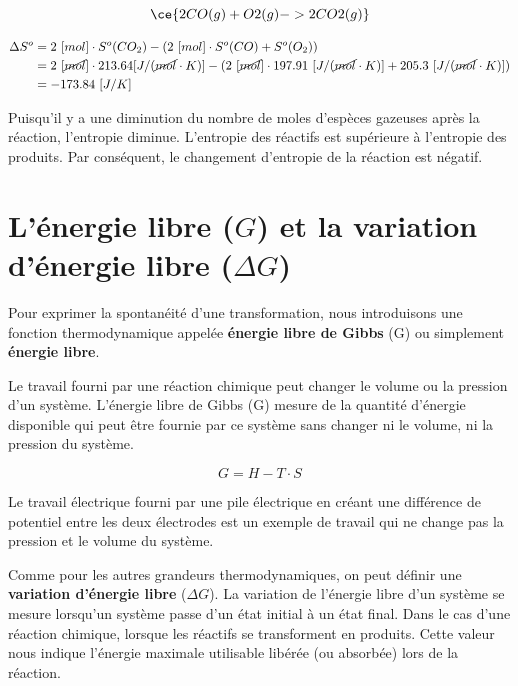 \documentclass[
  11pt,
  french,
  a4paper,
  openany]{book}
\begin{document}
\begin{Answer}

\[ \ce{2 CO(g) + O2(g) -> 2CO2(g)} \]

\[
\begin{split}
\Delta S^o &= 2\ [mol] \cdot S^o(CO_2) - ( 2\ [mol] \cdot S^o(CO) + S^o(O_2) ) \\
&= 2\ [\cancel{mol}] \cdot 213.64 [J/(\cancel{mol} \cdot K)] - ( 2\ [\cancel{mol}] \cdot 197.91\ [J/(\cancel{mol} \cdot K)] + 205.3\ [J/(\cancel{mol} \cdot K)] ) \\
&= -173.84\ [J/K]
\end{split}
\]

Puisqu'il y a une diminution du nombre de moles d'espèces gazeuses après la réaction, l'entropie diminue. L'entropie des réactifs est supérieure à l'entropie des produits. Par conséquent, le changement d'entropie de la réaction est négatif.

\clearpage


\end{Answer}

\hypertarget{luxe9nergie-libre-g-et-la-variation-duxe9nergie-libre-delta-g}{%
\section{\texorpdfstring{L'énergie libre (\(G\)) et la variation d'énergie libre (\(\Delta G\))}{L'énergie libre (G) et la variation d'énergie libre (\textbackslash Delta G)}}\label{luxe9nergie-libre-g-et-la-variation-duxe9nergie-libre-delta-g}}

Pour exprimer la spontanéité d'une transformation, nous introduisons une fonction thermodynamique appelée \textbf{énergie libre de Gibbs} (G) ou simplement \textbf{énergie libre}.

Le travail fourni par une réaction chimique peut changer le volume ou la pression d'un système. L'énergie libre de Gibbs (G) mesure de la quantité d'énergie disponible qui peut être fournie par ce système sans changer ni le volume, ni la pression du système.

\[
G = H - T \cdot S
\]

Le travail électrique fourni par une pile électrique en créant une différence de potentiel entre les deux électrodes est un exemple de travail qui ne change pas la pression et le volume du système.

Comme pour les autres grandeurs thermodynamiques, on peut définir une \textbf{variation d'énergie libre} (\(\Delta G\)). La variation de l'énergie libre d'un système se mesure lorsqu'un système passe d'un état initial à un état final. Dans le cas d'une réaction chimique, lorsque les réactifs se transforment en produits. Cette valeur nous indique l'énergie maximale utilisable libérée (ou absorbée) lors de la réaction.
\end{document}
